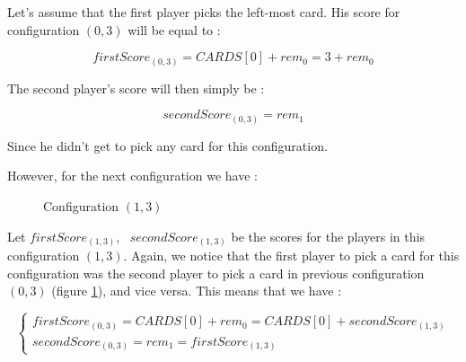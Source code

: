 \documentclass[a4paper,12pt,fleqn]{article}
\begin{document}
Let's assume that the first player picks the left-most card. His score for configuration $(0,3)$ will be equal to :

$$firstScore_{(0,3)} = CARDS[0] + rem_0 = 3 + rem_0 $$

The second player's score will then simply be :

$$secondScore_{(0,3)} = rem_1$$

Since he didn't get to pick any card for this configuration.

However, for the next configuration we have :

\begin{figure}[H]
    \centering
    \caption{Configuration $(1,3)$}
    \label{fig:recursive_04}
\end{figure}

\noindent
Let \texttt{$firstScore_{(1,3)}$}, \ \texttt{$secondScore_{(1,3)}$} be the scores for the players in this configuration $(1,3)$. Again, we notice that the first player to pick a card for this configuration was the second player to pick a card in previous configuration $(0,3)$ (figure \ref{fig:recursive_04}), and vice versa. This means that we have :

    \begin{equation}
    \begin{cases}

    firstScore_{(0,3)} = CARDS[0] + rem_0 = CARDS[0] + secondScore_{(1,3)} \\
    secondScore_{(0,3)} = rem_1 = firstScore_{(1,3)}
    
    \end{cases}
    \end{equation}
\end{document}
